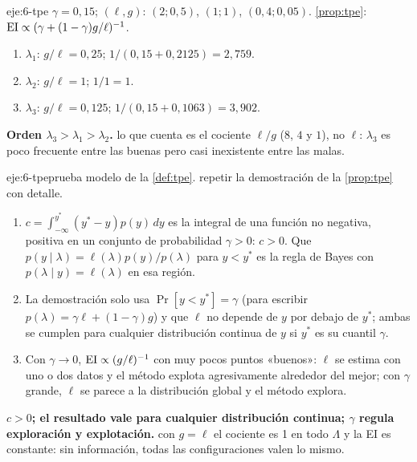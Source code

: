 \begin{solucion}{eje:6-tpe}
\datos $\gamma=0{,}15$; $(\ell,g)$: $(2;0{,}5)$, $(1;1)$, $(0{,}4;0{,}05)$.
\planteamiento \cref{prop:tpe}: $\operatorname{EI}\propto(\gamma+(1-\gamma)g/\ell)^{-1}$.
\pasos
\begin{enumerate}[label=\arabic*.]
  \item $\lambda_1$: $g/\ell=0{,}25$; $1/(0{,}15+0{,}2125)=2{,}759$.
  \item $\lambda_2$: $g/\ell=1$; $1/1=1$.
  \item $\lambda_3$: $g/\ell=0{,}125$; $1/(0{,}15+0{,}1063)=3{,}902$.
\end{enumerate}
\resultado \textbf{Orden $\lambda_3>\lambda_1>\lambda_2$.}
\comprobacion lo que cuenta es el cociente $\ell/g$ ($8$, $4$ y $1$), no $\ell$: $\lambda_3$ es poco frecuente entre las buenas pero casi inexistente entre las malas.
\end{solucion}

\begin{solucion}{eje:6-tpeprueba}
\datos modelo de la \cref{def:tpe}.
\planteamiento repetir la demostración de la \cref{prop:tpe} con detalle.
\pasos
\begin{enumerate}[label=(\alph*)]
  \item $c=\int_{-\infty}^{y^*}(y^*-y)p(y)\,dy$ es la integral de una función no negativa, positiva en un conjunto de probabilidad $\gamma>0$: $c>0$. Que $p(y\mid\lambda)=\ell(\lambda)p(y)/p(\lambda)$ para $y<y^*$ es la regla de Bayes con $p(\lambda\mid y)=\ell(\lambda)$ en esa región.
  \item La demostración solo usa $\Pr[y<y^*]=\gamma$ (para escribir $p(\lambda)=\gamma\ell+(1-\gamma)g$) y que $\ell$ no depende de $y$ por debajo de $y^*$; ambas se cumplen para cualquier distribución continua de $y$ si $y^*$ es su cuantil $\gamma$.
  \item Con $\gamma\to0$, $\operatorname{EI}\propto(g/\ell)^{-1}$ con muy pocos puntos «buenos»: $\ell$ se estima con uno o dos datos y el método explota agresivamente alrededor del mejor; con $\gamma$ grande, $\ell$ se parece a la distribución global y el método explora.
\end{enumerate}
\resultado \textbf{$c>0$; el resultado vale para cualquier distribución continua; $\gamma$ regula exploración y explotación.}
\comprobacion con $g=\ell$ el cociente es 1 en todo $\Lambda$ y la EI es constante: sin información, todas las configuraciones valen lo mismo.
\end{solucion}

